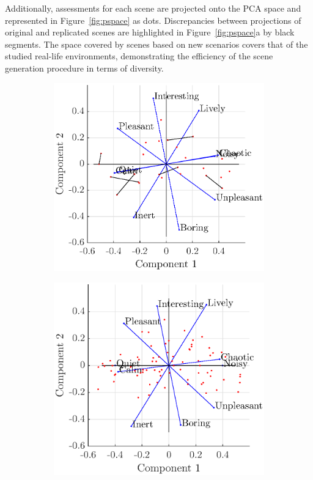 \documentclass[11pt,a4paper]{article}
\begin{document}
Additionally, assessments for each scene are projected onto the PCA space and represented in Figure~\ref{fig:pspace} as dots. Discrepancies between projections of original and replicated scenes are highlighted in Figure~\ref{fig:pspace}a by black segments. The space covered by scenes based on new scenarios covers that of the studied real-life environments, demonstrating the efficiency of the scene generation procedure in terms of diversity. 

\begin{figure}[h]
    \centering
     \begin{subfigure}[t]{0.5\textwidth}
        \centering
        \includegraphics[width=\textwidth]{figures/pca_rep.eps}
    \end{subfigure}%
    \begin{subfigure}[t]{0.5\textwidth}
        \centering
        \includegraphics[width=\textwidth]{figures/pca_sim.eps}

\end{subfigure}
\end{figure}
\end{document}
